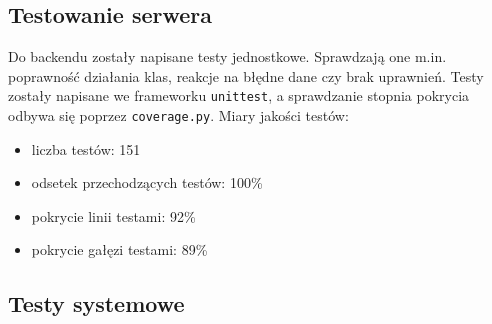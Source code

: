 \documentclass[11pt,a4paper]{article}
\renewcommand{\_}{\char`_}
\begin{document}
\subsection{Testowanie serwera}

Do backendu zostały napisane testy jednostkowe. Sprawdzają one m.in. poprawność działania klas, reakcje na błędne dane czy brak uprawnień. Testy zostały napisane we frameworku \texttt{unittest}, a sprawdzanie stopnia pokrycia odbywa się poprzez \texttt{coverage.py}. Miary jakości testów:
\begin{itemize}
    \item liczba testów: 151
    \item odsetek przechodzących testów: 100\%
    \item pokrycie linii testami: 92\%
    \item pokrycie gałęzi testami: 89\%
\end{itemize}

\subsection{Testy systemowe}
\end{document}
